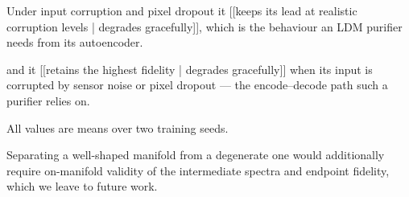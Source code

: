 Under input corruption and pixel dropout it [[keeps its lead at realistic
corruption levels | degrades gracefully]], which is the behaviour an LDM
purifier needs from its autoencoder.

and it [[retains the highest fidelity | degrades gracefully]] when its input is
corrupted by sensor noise or pixel dropout — the encode--decode path such a
purifier relies on.


All values are means over two training seeds.

Separating a well-shaped manifold from a degenerate one would additionally
require on-manifold validity of the intermediate spectra and endpoint fidelity,
which we leave to future work.

